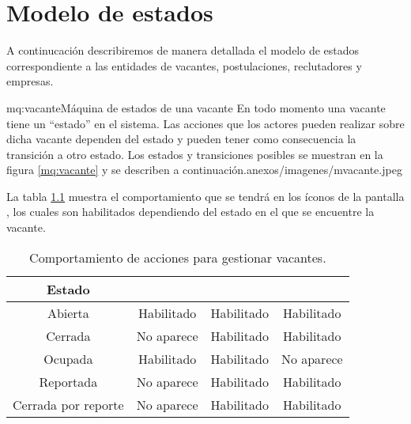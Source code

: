 \chapter{Modelo de estados}
A continucación describiremos de manera detallada el modelo de estados correspondiente a las entidades de vacantes, postulaciones, reclutadores
y empresas.
\begin{Maquina}{mq:vacante}{Máquina de estados de una vacante}{
	En todo momento una vacante tiene un ``estado'' en el sistema. Las acciones que los actores pueden realizar sobre dicha vacante 
	dependen del estado y pueden tener como consecuencia la transición a otro estado.
	Los estados y transiciones posibles se muestran en la figura \ref{mq:vacante} y se describen a continuación.}{anexos/imagenes/mvacante.jpeg}

	La tabla \ref{fig:mqvacante} muestra el comportamiento que se tendrá en los íconos de la pantalla 
	, los cuales son habilitados dependiendo del estado en el que se encuentre  la vacante.


	\begin{table}[htbp]
		\begin{center}
			\begin{tabular}{|c|c|c|c|}
				\hline
				Estado &\IUbutton{Cerrar vacante}& \IUEliminar & \IUEditar \\
				\hline \hline
				Abierta  & Habilitado & Habilitado & Habilitado \\ \hline
				Cerrada & No aparece & Habilitado & Habilitado \\ \hline
				Ocupada & Habilitado & Habilitado & No aparece \\ \hline
				Reportada & No aparece & Habilitado & Habilitado \\ \hline
				Cerrada por reporte & No aparece & Habilitado & Habilitado\\ \hline
			\end{tabular}
			\caption{Comportamiento de acciones para gestionar vacantes.} 
			\label{fig:mqvacante}

		\end{center}
	\end{table}
\end{Maquina}

